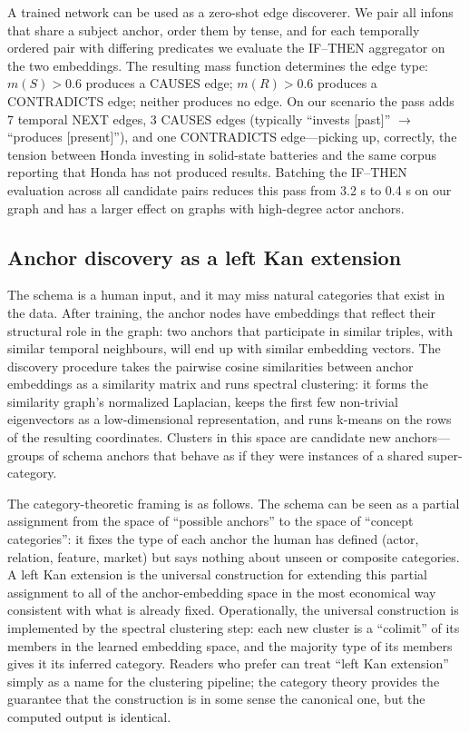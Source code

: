 \documentclass[11pt,a4paper]{article}
\begin{document}
A trained network can be used as a zero-shot edge discoverer.
We pair all infons that share a subject anchor, order them by
tense, and for each temporally ordered pair with differing
predicates we evaluate the IF--THEN aggregator on the two
embeddings. The resulting mass function determines the edge
type: $m(S) > 0.6$ produces a CAUSES edge; $m(R) > 0.6$ produces
a CONTRADICTS edge; neither produces no edge. On our scenario
the pass adds 7 temporal NEXT edges, 3 CAUSES edges (typically
``invests [past]'' $\to$ ``produces [present]''), and one
CONTRADICTS edge---picking up, correctly, the tension between
Honda investing in solid-state batteries and the same corpus
reporting that Honda has not produced results. Batching the
IF--THEN evaluation across all candidate pairs reduces this
pass from 3.2 s to 0.4 s on our graph and has a larger effect
on graphs with high-degree actor anchors.

\subsection{Anchor discovery as a left Kan extension}

The schema is a human input, and it may miss natural categories
that exist in the data. After training, the anchor nodes have
embeddings that reflect their structural role in the graph: two
anchors that participate in similar triples, with similar
temporal neighbours, will end up with similar embedding vectors.
The discovery procedure takes the pairwise cosine similarities
between anchor embeddings as a similarity matrix and runs
spectral clustering: it forms the similarity graph's normalized
Laplacian, keeps the first few non-trivial eigenvectors as a
low-dimensional representation, and runs k-means on the rows of
the resulting coordinates. Clusters in this space are candidate
new anchors---groups of schema anchors that behave as if they
were instances of a shared super-category.

The category-theoretic framing is as follows. The schema can be
seen as a partial assignment from the space of ``possible
anchors'' to the space of ``concept categories'': it fixes the
type of each anchor the human has defined (actor, relation,
feature, market) but says nothing about unseen or composite
categories. A left Kan extension is the universal construction
for extending this partial assignment to all of the
anchor-embedding space in the most economical way consistent
with what is already fixed. Operationally, the universal
construction is implemented by the spectral clustering step:
each new cluster is a ``colimit'' of its members in the learned
embedding space, and the majority type of its members gives it
its inferred category. Readers who prefer can treat ``left Kan
extension'' simply as a name for the clustering pipeline; the
category theory provides the guarantee that the construction is
in some sense the canonical one, but the computed output is
identical.
\end{document}
